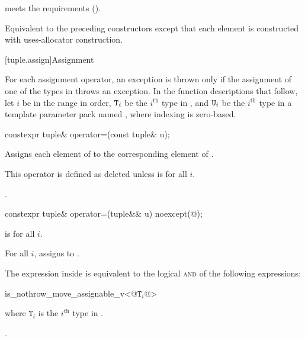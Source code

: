 \begin{itemdescr}
\pnum
\expects
{} meets the
 requirements ().

\pnum
\effects
Equivalent to the preceding constructors except that each element is constructed with
uses-allocator construction.
\end{itemdescr}

[tuple.assign]{Assignment}

\pnum
For each  assignment operator, an exception is thrown only if the
assignment of one of the types in  throws an exception.
In the function descriptions that follow, let $i$ be in the range 
in order, $\texttt{T}_i$ be the $i^\text{th}$ type in ,
and $\texttt{U}_i$ be the $i^\text{th}$ type in a
template parameter pack named , where indexing is zero-based.

%
\begin{itemdecl}
constexpr tuple& operator=(const tuple& u);
\end{itemdecl}

\begin{itemdescr}
\pnum
\effects
Assigns each element of  to the corresponding
element of .

\pnum
\remarks
This operator is defined as deleted unless
 is  for all $i$.

\pnum
\returns
{}.
\end{itemdescr}

%
\begin{itemdecl}
constexpr tuple& operator=(tuple&& u) noexcept(@\seebelow@);
\end{itemdecl}

\begin{itemdescr}
\pnum
\constraints
{} is  for all $i$.

\pnum
\effects
For all $i$, assigns  to
.

\pnum
\remarks
The expression inside  is equivalent to the logical \textsc{and} of the
following expressions:

\begin{codeblock}
is_nothrow_move_assignable_v<@$\mathtt{T}_i$@>
\end{codeblock}
where $\mathtt{T}_i$ is the $i^\text{th}$ type in .

\pnum
\returns
{}.
\end{itemdescr}

